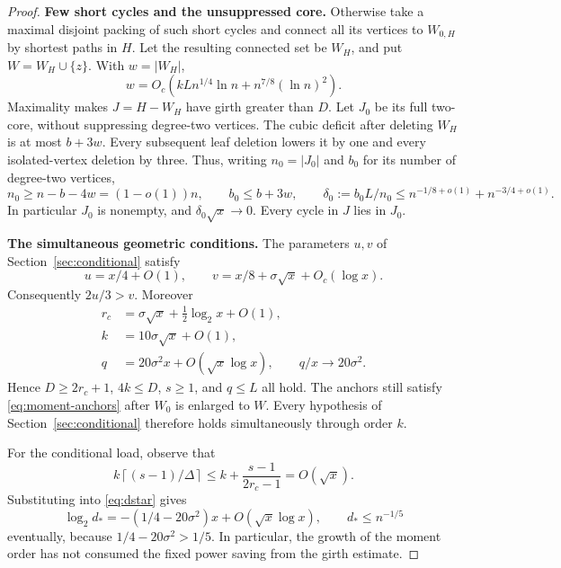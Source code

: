 \documentclass[11pt,a4paper]{article}
\numberwithin{equation}{section}
\theoremstyle{definition}
\theoremstyle{remark}
\newcommand{\proofstep}[1]{\par\addvspace{\medskipamount}\noindent\textbf{#1}\enspace\ignorespaces}
\newcommand{\ceil}[1]{\left\lceil#1\right\rceil}
\begin{document}
\begin{proof}
\proofstep{Few short cycles and the unsuppressed core.}
Otherwise take a maximal disjoint packing of such short cycles and connect all its vertices to $W_{0,H}$ by shortest paths in $H$. Let the resulting connected set be $W_H$, and put $W=W_H\cup\{z\}$. With $w=|W_H|$,
\begin{equation}\label{eq:connector-cost}
 w=O_c(kL n^{1/4}\ln n+n^{7/8}(\ln n)^2).
\end{equation}
Maximality makes $J=H-W_H$ have girth greater than $D$. Let $J_0$ be its full two-core, without suppressing degree-two vertices. The cubic deficit after deleting $W_H$ is at most $b+3w$. Every subsequent leaf deletion lowers it by one and every isolated-vertex deletion by three. Thus, writing $n_0=|J_0|$ and $b_0$ for its number of degree-two vertices,
\begin{equation}\label{eq:analytic-core}
 n_0\ge n-b-4w=(1-o(1))n,\qquad b_0\le b+3w,
 \qquad \delta_0:=b_0L/n_0\le n^{-1/8+o(1)}+n^{-3/4+o(1)}.
\end{equation}
In particular $J_0$ is nonempty, and $\delta_0\sqrt x\to0$. Every cycle in $J$ lies in $J_0$.

\proofstep{The simultaneous geometric conditions.}
The parameters $u,v$ of Section~\ref{sec:conditional} satisfy
\[
 u=x/4+O(1),\qquad
 v=x/8+\sigma\sqrt x+O_c(\log x).
\]
Consequently $2u/3>v$. Moreover
\begin{align*}
 r_c&=\sigma\sqrt x+\tfrac12\log_2x+O(1),\\
 k&=10\sigma\sqrt x+O(1),\\
 q&=20\sigma^2x+O(\sqrt x\log x),
 \qquad q/x\longrightarrow20\sigma^2.
\end{align*}
Hence $D\ge2r_c+1$, $4k\le D$, $s\ge1$, and $q\le L$ all hold. The anchors still satisfy \eqref{eq:moment-anchors} after $W_0$ is enlarged to $W$. Every hypothesis of Section~\ref{sec:conditional} therefore holds simultaneously through order $k$.

For the conditional load, observe that
\[
 k\ceil{(s-1)/\Delta}\le k+\frac{s-1}{2r_c-1}=O(\sqrt x).
\]
Substituting into \eqref{eq:dstar} gives
\begin{equation}\label{eq:load-exponent}
 \log_2d_*=-(1/4-20\sigma^2)x+O(\sqrt x\log x),
 \qquad d_*\le n^{-1/5}
\end{equation}
eventually, because $1/4-20\sigma^2>1/5$. In particular, the growth of the moment order has not consumed the fixed power saving from the girth estimate.


\end{proof}
\end{document}
